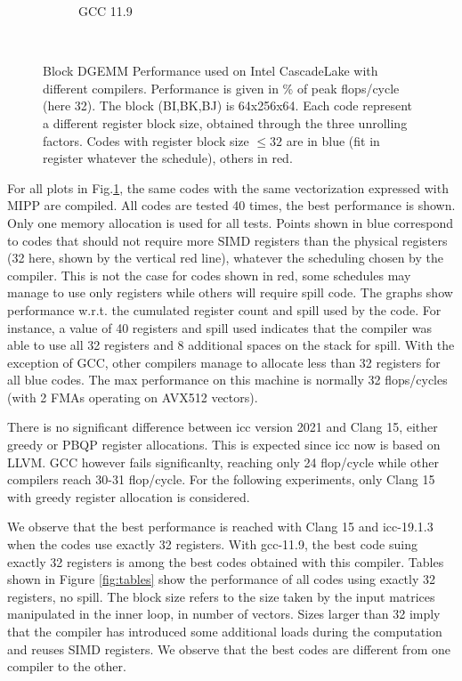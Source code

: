 \documentclass[sigconf,review]{acmart}
\begin{document}
\begin{figure}[ht]
\begin{subfigure}[h]{0.45\textwidth}
  \caption{GCC 11.9}
  \end{subfigure}\hfill ~
  \caption{Block DGEMM Performance used on Intel CascadeLake with different compilers. Performance is given in \% of peak flops/cycle (here 32). The block (BI,BK,BJ) is 64x256x64. Each code represent a different register block size, obtained through the three unrolling factors. Codes with register block size $\leq 32$ are in blue (fit in register whatever the schedule), others in red.  \label{fig:cascadelake}}
\end{figure}
 For all plots in Fig.\ref{fig:cascadelake}, the same codes with the same vectorization expressed with MIPP are
compiled. All codes are tested 40 times, the best performance is shown. Only one memory allocation is used for all tests. Points shown in blue correspond to codes that should not require
more SIMD registers than the physical registers (32 here, shown by the vertical red line), whatever
the scheduling chosen by the compiler. This is not the case for codes
shown in red, some schedules may manage to use only registers while
others will require spill code. The graphs show performance w.r.t. the
cumulated register count and spill used by the code. For instance, a value of 40 registers and
spill used indicates that the compiler was able to use all 32
registers and 8 additional spaces on the stack for spill. With the exception of
GCC, other compilers manage to allocate less than 32 registers for all
blue codes. The max performance on this machine is normally 32 flops/cycles (with 2 FMAs operating on AVX512 vectors).  

There is no significant difference between icc version 2021 and Clang
15, either greedy or PBQP register allocations. This is expected since
icc now is based on LLVM. GCC however fails significanlty, reaching
only 24 flop/cycle while other compilers reach 30-31 flop/cycle.  For
the following experiments, only Clang 15 with greedy register
allocation is considered.

We observe that the best performance is reached with Clang 15 and
icc-19.1.3 when the codes use exactly 32 registers. With gcc-11.9, the
best code suing exactly 32 registers is among the best codes obtained
with this compiler.  Tables shown in Figure \ref{fig:tables} show the
performance of all codes using exactly 32 registers, no spill. The
block size refers to the size taken by the input matrices manipulated
in the inner loop, in number of vectors. Sizes larger than 32 imply that the compiler has introduced some additional loads during the computation and reuses SIMD registers. We observe that the best codes are different from one compiler to the other. 
\end{document}
